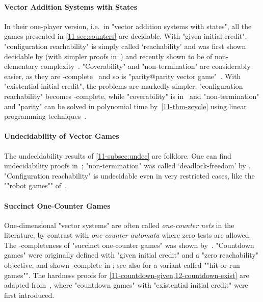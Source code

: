 \paragraph{Vector Addition Systems with States}
In their one-player version, i.e.\ in "vector addition systems with
states", all the games presented in \cref{11-sec:counters} are decidable.
With "given initial credit", "configuration reachability" is simply
called `reachability' and was first shown decidable by
 (with simpler proofs
in~\cite{Kosaraju:1982,Lambert:1992,Leroux:2011}) and recently shown
to be of non-elementary complexity~\cite{Czerwinski&Lasota&Lazic&Leroux&Mazowiecki:2019}.  "Coverability" and
"non-termination" are considerably easier, as they are
\EXPSPACE-complete~\cite{Lipton:1976,Rackoff:1978} and so is
"parity@parity vector game"~\cite{Habermehl:1997}.  With "existential
initial credit", the problems are markedly simpler: "configuration
reachability" becomes \EXPSPACE-complete, while "coverability" is in
\NL\ and "non-termination" and "parity" can be solved in polynomial
time by~\cref{11-thm-zcycle} using linear programming
techniques~\cite{Kosaraju&Sullivan:1988}.

\paragraph{Undecidability of Vector Games}
The undecidability results of \cref{11-subsec:undec} are folklore.  One
can find undecidability proofs
in~\cite{Abdulla&Bouajjani&dOrso:2003,Raskin&Samuelides&VanBegin:2005};
"non-termination" was called `deadlock-freedom' by . "Configuration reachability" is
undecidable even in very restricted cases, like the ""robot games""
of~\citet{Niskanen&Potapov&Reichert:2016}.

\paragraph{Succinct One-Counter Games}
One-dimensional "vector systems" are often called \emph{one-counter
nets} in the literature, by contrast with \emph{one-counter automata}
where zero tests are allowed.  The \EXPSPACE-completeness of "succinct
one-counter games" was shown by~.  "Countdown games"
were originally defined with "given initial credit" and a "zero
reachability" objective, and shown
\EXP-complete in \cite{Jurdzinski&Laroussinie&Sproston:2008}; see also
\citet{Kiefer:2013} for a variant called ""hit-or-run games"".  The
hardness proofs for \cref{11-countdown-given,12-countdown-exist} are
adapted from~\citet{Jancar&Osicka&Sawa:2018}, where "countdown games"
with "existential initial credit" were first introduced.

